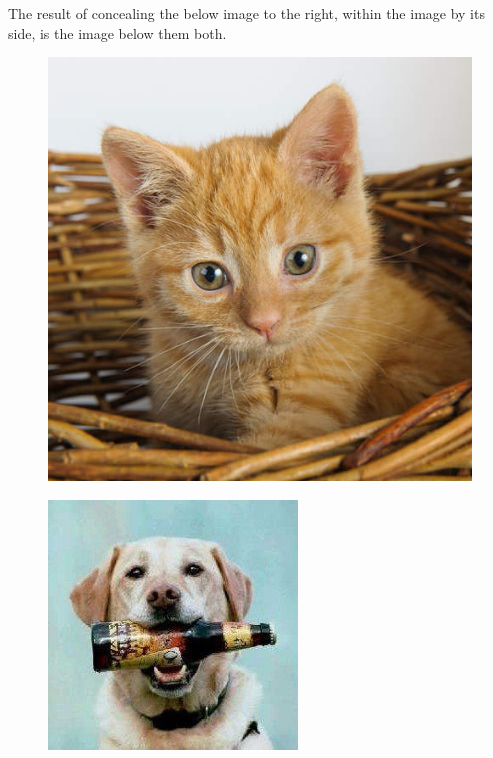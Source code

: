 The result of concealing the below image to the right, within the image by its side, is the image below them both.

\begin{figure}
	\centering
	\begin{minipage}{.45\linewidth}
		\includegraphics[width=\linewidth]{sections/pictures/vessel.jpg}
		\label{img1}
	\end{minipage}
	\hspace{.05\linewidth}
	\begin{minipage}{.45\linewidth}
		\includegraphics[width=\linewidth]{sections/pictures/concealed.jpg}

\end{minipage}
\end{figure}
